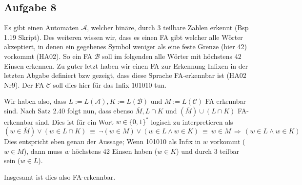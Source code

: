 \documentclass[a4paper,graphics,11pt]{article}
\newcommand{\aufgabe}[1]{\subsection*{Aufgabe #1}}
\begin{document}
\newpage
\aufgabe{8}
Es gibt einen Automaten $\mathcal{A}$, welcher binäre, durch 3 teilbare Zahlen erkennt (Bsp 1.19 Skript).
Des weiteren wissen wir, dass es einen FA gibt welcher alle Wörter akzeptiert,
in denen ein gegebenes Symbol weniger als eine feste Grenze (hier 42) vorkommt (HA02). So ein FA $\mathcal{B}$
soll im folgenden alle Wörter mit höchstens 42 Einsen erkennen.
Zu guter letzt haben wir einen FA zur Erkennung Infixen in der letzten Abgabe definiert bzw gezeigt, dass diese Sprache FA-erkennbar ist (HA02 Nr9). Der FA $\mathcal{C}$ soll dies hier für das Infix 101010 tun.

Wir haben also, dass $L := L(\mathcal{A}), K := L(\mathcal{B})$ und $M := L(\mathcal{C})$ FA-erkennbar sind.
Nach Satz 2.40 folgt nun, dass ebenso $\overline{M}, L \cap K$ und $(\overline{M}) \cup (L \cap K)$ FA-erkennbar
sind.
Dies ist für ein Wort $w \in \{0, 1\}^*$ logisch zu interpretieren als
$$
    (w \in \overline{M}) \lor (w \in L \cap K)\
    \equiv\ \lnot (w \in M) \lor (w \in L \land w \in K)\
    \equiv\ w \in M \,\Longrightarrow\, (w \in L \land w \in K)
$$
Dies entspricht eben genau der Aussage; Wenn 101010 als Infix in $w$ vorkommt ($w \in M$), dann muss 
$w$ höchstens 42 Einsen haben ($w \in K$) und durch 3 teilbar sein ($w \in L$).

Insgesamt ist dies also FA-erkennbar.
\end{document}
